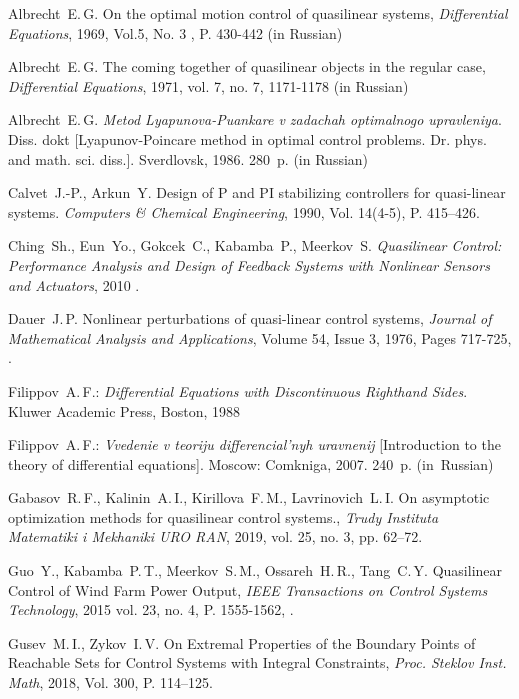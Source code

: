 \documentclass[../main.tex]{subfiles}
\begin{document}
\begin{thebibliography}{99}
Albrecht~E.\,G. On the optimal motion control of quasilinear systems, \emph{Differential Equations}, 1969, Vol.5, No. 3 , P. 430-442 (in Russian)

Albrecht~E.\,G. The coming together of quasilinear objects in the regular case, \emph{Differential Equations}, 1971, vol. 7, no. 7, 1171-1178 (in Russian)

Albrecht~E.\,G. \emph{Metod Lyapunova-Puankare v zadachah optimalnogo upravleniya}. Diss.
dokt [Lyapunov-Poincare method in optimal control problems. Dr. phys. and math. sci. diss.].
Sverdlovsk, 1986. 280~p. (in Russian)

Calvet~J.-P., Arkun~Y. Design of P and PI stabilizing controllers for quasi-linear systems. \emph{Computers \& Chemical Engineering}, 1990, Vol. 14(4-5), P. 415–426. 

Ching~Sh., Eun~Yo., Gokcek~C., Kabamba~P., Meerkov~S. \emph{Quasilinear Control: Performance Analysis and Design of Feedback Systems with Nonlinear Sensors and Actuators}, 2010 . 

Dauer~J.\,P. Nonlinear perturbations of quasi-linear control systems,
\emph{Journal of Mathematical Analysis and Applications},
Volume 54, Issue 3,
1976,
Pages 717-725,
.

Filippov~A.\,F.: \emph{Differential Equations with Discontinuous Righthand Sides}. Kluwer Academic Press, Boston, 1988

Filippov~A.\,F.: \emph{Vvedenie v teoriju differencial'nyh uravnenij} [Introduction to the theory of differential equations]. Moscow: Comkniga, 2007. 240~p. (in~Russian)

Gabasov~R.\,F., Kalinin~A.\,I.,  Kirillova~F.\,M., Lavrinovich~L.\,I. On asymptotic optimization methods for quasilinear control systems., \emph{Trudy Instituta Matematiki i Mekhaniki URO
	RAN}, 2019, vol. 25, no. 3, pp. 62–72.

Guo~Y., Kabamba~P.\,T., Meerkov~S.\,M.,  Ossareh~H.\,R., Tang~C.\,Y. Quasilinear Control of Wind Farm Power Output, \emph{IEEE Transactions on Control Systems Technology}, 2015 vol. 23, no. 4, P. 1555-1562,  .


Gusev~M.\,I., Zykov~I.\,V. On Extremal Properties of the Boundary Points of Reachable Sets for Control Systems with Integral Constraints, \emph{Proc. Steklov Inst. Math}, 2018, Vol. 300, P. 114--125. 


\end{thebibliography}
\end{document}
